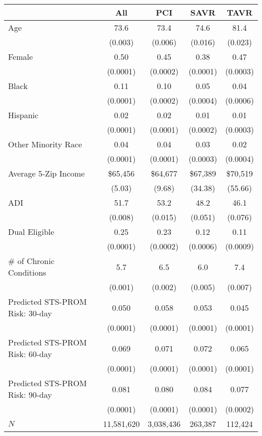 \begin{table}[H]
\centering
\begin{threeparttable}
\begin{tabular}{l|c|ccc}
\toprule
& All & PCI & SAVR & TAVR \\
\midrule
Age &   73.6 &   73.4 &   74.6 &   81.4 \\
& (0.003) & (0.006) & (0.016) &  (0.023) \\
Female &   0.50 &   0.45 &   0.38 &   0.47 \\
& (0.0001) & (0.0002) & (0.0001) &  (0.0003) \\
Black &   0.11 &   0.10 &   0.05 &   0.04 \\
& (0.0001) & (0.0002) & (0.0004) &  (0.0006) \\
Hispanic &   0.02 &   0.02 &   0.01 &   0.01 \\
& (0.0001) & (0.0001) & (0.0002) &  (0.0003) \\
Other Minority Race &   0.04 &   0.04 &   0.03 &   0.02 \\
& (0.0001) & (0.0001) & (0.0003) &  (0.0004) \\
Average 5-Zip Income & \$65,456 & \$64,677 & \$67,389 & \$70,519 \\
& (5.03) & (9.68) & (34.38) &  (55.66) \\
ADI &   51.7 &   53.2 &   48.2 &   46.1 \\
& (0.008) & (0.015) & (0.051) &  (0.076) \\
Dual Eligible &   0.25 &   0.23 &   0.12 &   0.11 \\
& (0.0001) & (0.0002) & (0.0006) &  (0.0009) \\
\# of Chronic Conditions &    5.7 &    6.5 &    6.0 &    7.4 \\
& (0.001) & (0.002) & (0.005) &  (0.007) \\
\midrule 
Predicted STS-PROM Risk: 30-day &   0.050 &   0.058 &   0.053 &   0.045 \\
& (0.0001) & (0.0001) & (0.0001) &  (0.0001) \\
Predicted STS-PROM Risk: 60-day &   0.069 &   0.071 &   0.072 &   0.065  \\
& (0.0001) & (0.0001) & (0.0001) &  (0.0001) \\
Predicted STS-PROM Risk: 90-day &   0.081 &   0.080 &   0.084 &   0.077 \\
& (0.0001) & (0.0001) & (0.0001) &  (0.0002) \\
\midrule 
$N$ & 11,581,620 & 3,038,436 & 263,387 & 112,424 \\ 

\end{tabular}
\end{threeparttable}
\end{table}
